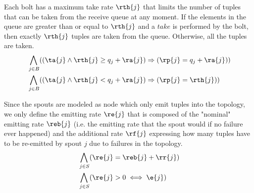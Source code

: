 Each bolt has a maximum take rate $\rth{j}$ that limits the number of tuples that can be taken from the receive queue at any moment.
If the elements in the queue are greater than or equal to $\rth{j}$ and a $take$ is performed by the bolt, then exactly $\rth{j}$ tuples are taken from the queue. Otherwise, all the tuples are taken. 
\begin{align*}
%
%
& \bigwedge_{
\begin{subarray}{c}
\,j \in B
\end{subarray}
}((\ta{j} \land \rth{j} \geq q_j + \ra{j}) \Rightarrow (\rp{j} = q_j + \ra{j})) \\
%
%
%
%
& \bigwedge_{
\begin{subarray}{c}
\,j \in B
\end{subarray}
}((\ta{j} \land \rth{j} < q_j + \ra{j}) \Rightarrow (\rp{j} = \rth{j}))
%
%
\end{align*}

Since the spouts are modeled as node which only emit tuples into the topology, we only define the emitting rate $\re{j}$  that is composed of the "nominal" emitting rate $\reb{j}$ (i.e. the emitting rate that the spout would if no failure ever happened) and the additional rate $\rf{j}$ expressing how many tuples have to be re-emitted by spout $j$ due to failures in the topology.
\begin{align*}
%
& \bigwedge_{
\begin{subarray}{c}
\,j \in S\\
\end{subarray}
} ( \re{j} = \reb{j} + \rr{j}) \\
%
%
& \bigwedge_{
\begin{subarray}{c}
\,j \in S\\
\end{subarray}
} ( \re{j} > 0 \iff \e{j}) \\
%
%
\end{align*}






